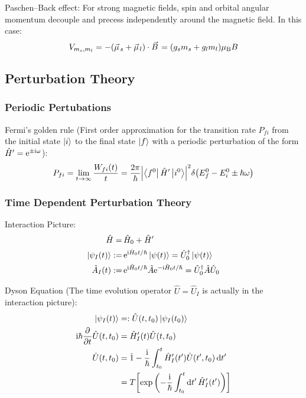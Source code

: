 			\noindent
			Paschen--Back effect: For strong magnetic fields, spin and orbital angular momentum decouple and precess independently around the magnetic field. In this case:
			\begin{equation}
				V_{m_s,m_l} = -\qty(\vec{\mu}_s + \vec{\mu}_l)\cdot\vec{B}
				=\qty(g_s m_s + g_l m_l) \mu_\text{B} B
			\end{equation}

	\subsection{Perturbation Theory}
		\subsubsection{Periodic Pertubations}
			\noindent
			Fermi's golden rule (First order approximation for the transition rate $P_{fi}$ from the initial state $\Ket{i}$ to the final state $\Ket{f}$ with a periodic perturbation of the form $\hat{H}' = \mathrm{e}^{\pm\mathrm{i}\omega}$):
			\begin{equation}
				P_{fi} = \lim_{t \to \infty} \frac{W_{fi}(t)}{t} = \frac{2\pi}{\hbar} \abs{\Bra{f^0}\hat{H}'\Ket{i^0}}^2 \delta\qty(E_f^0 - E_i^0 \pm \hbar\omega)
			\end{equation}

		\subsubsection{Time Dependent Perturbation Theory}
			Interaction Picture:
			\begin{equation}
				\begin{aligned}
					\hat{H} =&\, \hat{H}_0 + \hat{H}' \\
					\Ket{\psi_I(t)} :=&\, \mathrm{e}^{\mathrm{i} \hat{H}_0 t / \hbar} \Ket{\psi(t)}
					= \hat{U}_0^\dagger \Ket{\psi(t)} \\
					\Hat{A}_I(t) :=&\, \mathrm{e}^{\mathrm{i} \hat{H}_0 t / \hbar} \hat{A} \mathrm{e}^{-\mathrm{i} \hat{H}_0 t / \hbar}
					= \hat{U}_0^\dagger \hat{A} \hat{U}_0
				\end{aligned}
			\end{equation}

			\noindent
			Dyson Equation (The time evolution operator $\hat{U} = \hat{U}_I$ is actually in the interaction picture):
			\begin{equation}
				\begin{aligned}
					\Ket{\psi_I(t)} &=: \hat{U}(t,t_0) \Ket{\psi_I(t_0)} \\
					\mathrm{i} \hbar \pdv{t} \hat{U}(t,t_0) &= \hat{H}_I'(t) \hat{U}(t,t_0) \\
					\hat{U}(t,t_0) &= \hat{1} - \frac{\mathrm{i}}{\hbar} \int_{t_0}^{t} \hat{H}'_I(t') \hat{U}(t',t_0) \dd{t'} \\
					&= T \qty[\exp\qty(-\frac{\mathrm{i}}{\hbar}\int_{t_0}^{t}\dd t'\,\hat{H}'_I(t'))]
				\end{aligned}
			\end{equation}

